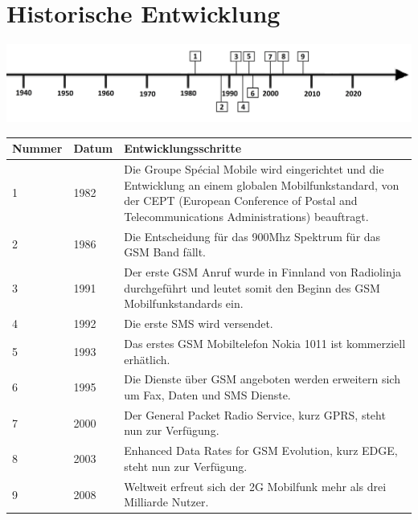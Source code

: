 \section*{Historische Entwicklung}
\includegraphics[width=\textwidth]{Kapitel/G2/Grafiken/Zeitstrahl}
\par
\noindent
\begin{tabular}{|p{1 cm}|p{3 cm}|p{13.55 cm}|}
	\hline
	Nummer & Datum & Entwicklungsschritte~ \cite{G2.1}\cite{G2.3}\\
	\hline
	1 & 1982 & Die Groupe Spécial Mobile wird eingerichtet und die Entwicklung an einem globalen Mobilfunkstandard, von der CEPT (European Conference of Postal and Telecommunications Administrations) beauftragt.\\
	\hline
	2 & 1986 & Die Entscheidung für das 900Mhz Spektrum für das GSM Band fällt.\\
	\hline
	3 & 1991 & Der erste GSM Anruf wurde in Finnland von Radiolinja durchgeführt und leutet somit den Beginn des GSM Mobilfunkstandards ein.\\
	\hline
	4 & 1992 & Die erste SMS wird versendet.\\
	\hline
	5 & 1993 & Das erstes GSM Mobiltelefon Nokia 1011 ist kommerziell erhätlich.\\
	\hline
	6 & 1995 & Die Dienste über GSM angeboten werden erweitern sich um Fax, Daten und SMS Dienste.\\
	\hline
	7 & 2000 & Der General Packet Radio Service, kurz GPRS, steht nun zur Verfügung.\\
	\hline
	8 & 2003 & Enhanced Data Rates for GSM Evolution, kurz EDGE, steht nun zur Verfügung.\\
	\hline
	9 & 2008 & Weltweit erfreut sich der 2G Mobilfunk mehr als drei Milliarde Nutzer.\\
	\hline
\end{tabular}
\par
